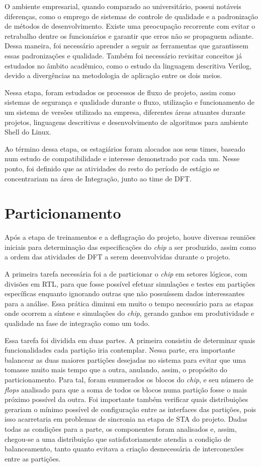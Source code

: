 \documentclass[
	12pt,				%
    oneside,			%
	a4paper,			%
	english,			%
	french,				%
	spanish,			%
	brazil				%
	]{abntex2}
\begin{document}
O ambiente empresarial, quando comparado ao universitário, possui notáveis diferenças, como o emprego de sistemas de controle de qualidade e a padronização de métodos de desenvolvimento. Existe uma preocupação recorrente com evitar o retrabalho dentre os funcionários e garantir que erros não se propaguem adiante. Dessa maneira, foi necessário aprender a seguir as ferramentas que garantissem essas padronizações e qualidade. Também foi necessário revisitar conceitos já estudados no âmbito acadêmico, como o estudo da linguagem descritiva Verilog, devido a divergências na metodologia de aplicação entre os dois meios.

Nessa etapa, foram estudados os processos de fluxo de projeto, assim como sistemas de segurança e qualidade durante o fluxo, utilização e funcionamento de um sistema de versões utilizado na empresa, diferentes áreas atuantes durante projetos, linguagens descritivas e desenvolvimento de algoritmos para ambiente Shell do Linux.

Ao término dessa etapa, os estagiários foram alocados aos seus times, baseado num estudo de compatibilidade e interesse demonstrado por cada um. Nesse ponto, foi definido que as atividades do resto do período de estágio se concentrariam na área de Integração, junto ao time de DFT. 

\section{Particionamento}

Após a etapa de treinamentos e a deflagração do projeto, houve diversas reuniões iniciais para determinação das especificações do \textit{chip} a ser produzido, assim como a ordem das atividades de DFT a serem desenvolvidas durante o projeto.

A primeira tarefa necessária foi a de particionar o \textit{chip} em setores lógicos, com divisões em RTL, para que fosse possível efetuar simulações e testes em partições específicas enquanto ignorando outras que não possuíssem dados interessantes para a análise. Essa prática diminui em muito o tempo necessário para as etapas onde ocorrem a síntese e simulações do \textit{chip}, gerando ganhos em produtividade e qualidade na fase de integração como um todo.

Essa tarefa foi dividida em duas partes. A primeira consistiu de determinar quais funcionalidades cada partição iria contemplar. Nessa parte, era importante balancear as duas maiores partições desejadas no sistema para evitar que uma tomasse muito mais tempo que a outra, anulando, assim, o propósito do particionamento. Para tal, foram enumerados os blocos do \textit{chip}, e seu número de \textit{flops} analisado para que a soma de todos os blocos numa partição fosse o mais próximo possível da outra. Foi importante também verificar quais distribuições gerariam o mínimo possível de configuração entre as interfaces das partições, pois isso acarretaria em problemas de sincronia na etapa de STA do projeto. Dadas todas as condições para a parte, os componentes foram analisados e, assim, chegou-se a uma distribuição que satisfatoriamente atendia a condição de balanceamento, tanto quanto evitava a criação desnecessária de interconexões entre as partições.
\end{document}
